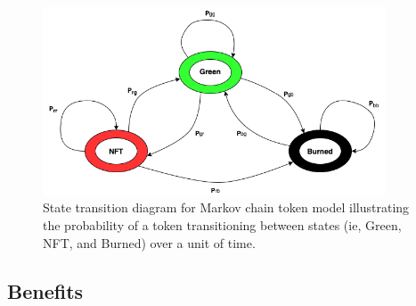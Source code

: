 \documentclass{article}
\begin{document}
\begin{figure}
\centering
\includegraphics[width=4in]{state_diagram.png}
\caption{State transition diagram for Markov chain token model illustrating the probability of a token transitioning between states (ie, Green, NFT, and Burned) over a unit of time.} 
\label{fig:state_diagram}
\end{figure} 

\subsection{Benefits}
\end{document}
